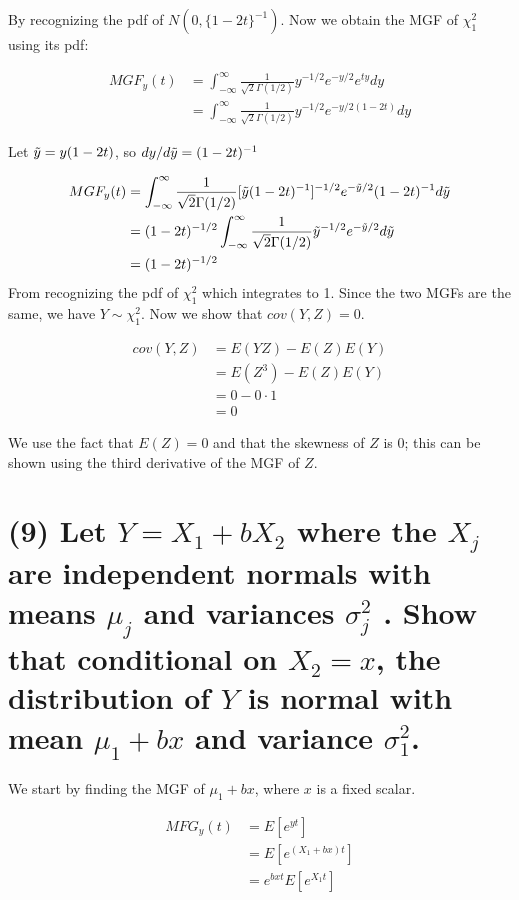 \documentclass[11pt]{article}
\begin{document}
 By recognizing the pdf of $N(0, \{1-2t\}^{-1})$. Now we obtain the MGF of $\chi^2_1$ using its pdf:
 
  \begin{align*}
     MGF_y(t) &=   \int_{-\infty}^{\infty} \frac{1}{\sqrt{2}\Gamma(1/2)} y^{-1/2}e^{-y/2}e^{ty}dy\\
     &=  \int_{-\infty}^{\infty} \frac{1}{\sqrt{2}\Gamma(1/2)} y^{-1/2}e^{-y/2(1-2t)}dy
 \end{align*}
 
 Let $\Tilde{y} = y(1-2t)$, so $dy/d\Tilde{y} = (1-2t)^{-1}$
 
   \begin{align*}
     MGF_y(t) &=  \int_{-\infty}^{\infty} \frac{1}{\sqrt{2}\Gamma(1/2)} [\Tilde{y}(1-2t)^{-1}]^{-1/2}e^{-\Tilde{y}/2}(1-2t)^{-1}d\Tilde{y}\\
     &=  (1-2t)^{-1/2} \int_{-\infty}^{\infty} \frac{1}{\sqrt{2}\Gamma(1/2)} \Tilde{y}^{-1/2}e^{-\Tilde{y}/2}d\Tilde{y}\\
      &=  (1-2t)^{-1/2}
 \end{align*}
From recognizing the pdf of  $\chi^2_1$ which integrates to 1. Since the two MGFs are the same, we have $Y \sim \chi^2_1$. Now we show that $cov(Y, Z)=0$.

\begin{align*}
    cov(Y, Z) &= E(YZ) - E(Z)E(Y)\\
    &= E(Z^3) - E(Z)E(Y)\\
    &= 0 - 0 \cdot 1\\
    &= 0
\end{align*}

We use the fact that $E(Z) = 0$ and that the skewness of $Z$ is 0; this can be shown using the third derivative of the MGF of $Z$.



\section*{(9) Let $Y = X_1 + bX_2$ where the $X_j$ are independent normals with means $\mu_j$ and variances $\sigma^2_j$ . Show that conditional on $X_2 = x$, the distribution of $Y$ is normal
with mean $\mu_1 + bx$ and variance $\sigma^2_1$.}

We start by finding the MGF of $\mu_1 + bx$, where $x$ is a fixed scalar. 

\begin{align*}
    MFG_y(t) &= E[e^{yt}] \\
    &=  E[e^{(X_1+bx)t}] \\ 
    & = e^{bxt}E[e^{X_1t}]\\
\end{align*}
\end{document}
